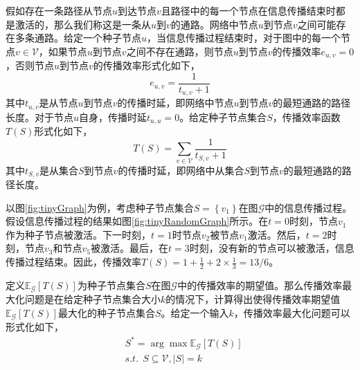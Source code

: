 \begin{mydef}[传播效率]\label{def:ie}
假如存在一条路径从节点$u$到达节点$v$且路径中的每一个节点在信息传播结束时都是激活的，那么我们称这是一条从$u$到$v$的通路。网络中节点$u$到节点$v$之间可能存在多条通路。给定一个种子节点$u$，当信息传播过程结束时，对于图中的每一个节点$v \in \mathcal{V}$，如果节点$u$到节点$v$之间不存在通路，则节点$u$到节点$v$的传播效率$e_{u,v}=0$，否则节点$u$到节点$v$的传播效率形式化如下，
\begin{equation}\label{eq:efficiency}
    e_{u,v} = \frac{1}{t_{u,v}+1}
\end{equation}
其中$t_{u,v}$是从节点$u$到节点$v$的传播时延，即网络中节点$u$到节点$v$的最短通路的路径长度。对于节点$u$自身，传播时延$t_{u,u}=0$。给定种子节点集合$S$，传播效率函数$T\left(S\right)$形式化如下，
\begin{equation}\label{eq:influenceEfficiency}
    T\left(S\right)=\sum\limits_{v\in\mathcal{V}}{\frac{1}{t_{S,v}+1}}
\end{equation}
其中$t_{S,v}$是从集合$S$到节点$v$的传播时延，即网络中从集合$S$到节点$v$的最短通路的路径长度。
\end{mydef}

以图\ref{fig:tinyGraph}为例，考虑种子节点集合$S=\left\{v_1\right\}$在图$\mathcal{G}$中的信息传播过程。假设信息传播过程的结果如图\ref{fig:tinyRandomGraph}所示。在$t=0$时刻，节点$v_1$作为种子节点被激活。下一时刻，$t=1$时节点$v_2$被节点$v_1$激活。然后，$t=2$时刻，节点$v_3$和节点$v_5$被激活。最后，在$t=3$时刻，没有新的节点可以被激活，信息传播过程结束。因此，传播效率$T\left(S\right)=1+\frac{1}{2}+2\times\frac{1}{3}=13/6$。

定义$\mathbb{E}_\mathcal{G}\left[T\left(S\right)\right]$为种子节点集合$S$在图$\mathcal{G}$中的传播效率的期望值。那么传播效率最大化问题是在给定种子节点集合大小$k$的情况下，计算得出使得传播效率期望值$\mathbb{E}_\mathcal{G}\left[T\left(S\right)\right]$最大化的种子节点集合$S$。给定一个输入$k$，传播效率最大化问题可以形式化如下，
\begin{equation}
\label{iem:Problem}
    \begin{split}
        &S^{\ast} = \arg\max{\mathbb{E}_\mathcal{G}\left[T\left(S\right)\right]}\\
        &s.t.~~S \subseteq \mathcal{V},\left\vert{S}\right\vert = k
    \end{split}
\end{equation}

